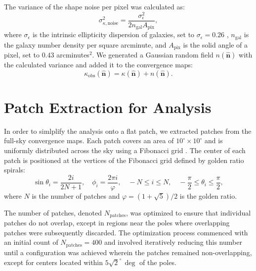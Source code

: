 The variance of the shape noise per pixel was calculated as:
\begin{equation}
    \sigma_{\kappa, \text{noise}}^2 = \frac{\sigma_{\epsilon}^2}{2 n_{\mathrm{gal}} A_{\mathrm{pix}}},
\end{equation}
where $\sigma_{\epsilon}$ is the intrinsic ellipticity dispersion of galaxies, set to $\sigma_{\epsilon} = 0.26$ \citep{2019A&A...627A..59E}, $n_{\mathrm{gal}}$ is the galaxy number density per square arcminute, and $A_{\mathrm{pix}}$ is the solid angle of a pixel, set to $0.43$ arcminutes$^2$.
We generated a Gaussian random field $n(\hat{\mathbf{n}})$ with the calculated variance and added it to the convergence maps:
\begin{equation}
    \kappa_{\mathrm{obs}}(\hat{\mathbf{n}}) = \kappa(\hat{\mathbf{n}}) + n(\hat{\mathbf{n}}).
\end{equation}

\section{Patch Extraction for Analysis}
In order to simlplify the analysis onto a flat patch, we extracted patches from the full-sky convergence maps. Each patch covers an area of $10^\circ \times 10^\circ$ and is uniformly distributed across the sky using a Fibonacci grid \citep{2006QJRMS.132.1769S, 2023MNRAS.524.5591F}. The center of each patch is positioned at the vertices of the Fibonacci grid defined by golden ratio spirals:
\begin{equation}
    \sin \theta_i = \frac{2i}{2N + 1}, \quad \phi_i = \frac{2 \pi i}{\varphi}, \quad -N \leq i \leq N, \quad -\frac{\pi}{2} \leq \theta_i \leq \frac{\pi}{2},
\end{equation}
where $N$ is the number of patches and $\varphi = (1 + \sqrt{5})/2$ is the golden ratio.

The number of patches, denoted \( N_{\text{patches}} \), was optimized to ensure that individual patches do not overlap, except in regions near the poles where overlapping patches were subsequently discarded. The optimization process commenced with an initial count of \( N_{\text{patches}} = 400 \) and involved iteratively reducing this number until a configuration was achieved wherein the patches remained non-overlapping, except for centers located within \( 5\sqrt{2}^\circ \, \mathrm{\deg}\) of the poles.

